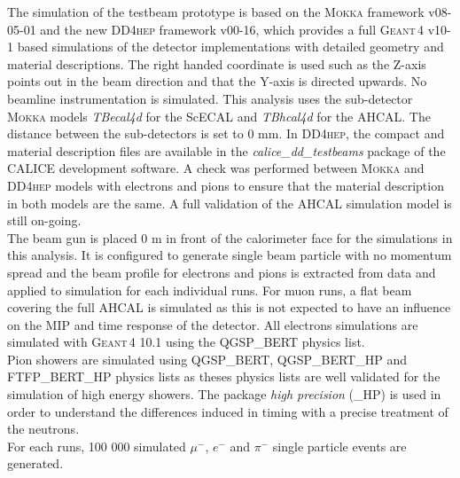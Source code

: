 \documentclass[twoside,a4paper,11pt]{article}
\newcommand\geant{\textsc{Geant\,4}\xspace}
\newcommand\mokka{\textsc{Mokka}\xspace}
\newcommand\ddhep{\textsc{DD4hep}\xspace}
\begin{document}
The simulation of the testbeam prototype is based on the \mokka framework v08-05-01 and the new \ddhep framework v00-16, which provides a full \geant v10-1 based simulations of the detector implementations with detailed geometry and material descriptions. The right handed coordinate is used such as the Z-axis points out in the beam direction and that the Y-axis is directed upwards. No beamline instrumentation is simulated. This analysis uses the sub-detector \mokka models \textit{TBecal4d} for the ScECAL and \textit{TBhcal4d} for the AHCAL. The distance between the sub-detectors is set to 0 mm. In \ddhep, the compact and material description files are available in the \textit{calice\_dd\_testbeams} package of the CALICE development software. A check was performed between \mokka and \ddhep models with electrons and pions to ensure that the material description in both models are the same. A full validation of the AHCAL simulation model is still on-going.\\
The beam gun is placed 0 m in front of the calorimeter face for the simulations in this analysis. It is configured to generate single beam particle with no momentum spread and the beam profile for electrons and pions is extracted from data and applied to simulation for each individual runs. For muon runs, a flat beam covering the full AHCAL is simulated as this is not expected to have an influence on the MIP and time response of the detector.
All electrons simulations are simulated with \geant 10.1 using the QGSP\_BERT physics list.\\
Pion showers are simulated using QGSP\_BERT, QGSP\_BERT\_HP and FTFP\_BERT\_HP physics lists as theses physics lists are well validated for the simulation of high energy showers. The package \textit{high precision} (\_HP) is used in order to understand the differences induced in timing with a precise treatment of the neutrons.\\
For each runs, 100 000 simulated $\mu^-$, $e^-$ and $\pi^-$ single particle events are generated.\\
\end{document}
